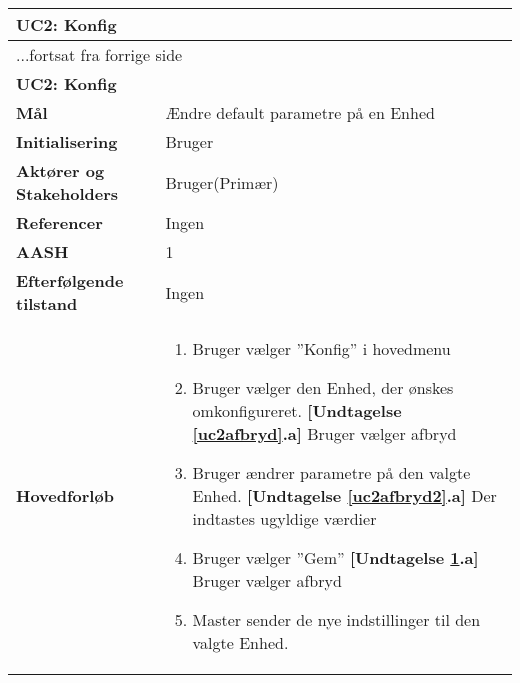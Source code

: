 \begin{center} \centering \label{UC2}
	\begin{longtable}{|p{5cm}|p{9cm}|}  %
	\hline
		\multicolumn{2}{|l|}{\textbf{UC2: Konfig}} \\\hline %
		\endfirsthead
		
		\multicolumn{2}{l}{...fortsat fra forrige side} \\ \hline %
		\multicolumn{2}{|l|}{\textbf{UC2: Konfig}} \\\hline %
		\endhead	
		
		\textbf{Mål}								&Ændre default parametre på en Enhed			\\\hline
		\textbf{Initialisering}					&Bruger							\\\hline
		\textbf{Aktører og Stakeholders}			&Bruger(Primær)					\\\hline
		\textbf{Referencer}						&Ingen							\\\hline
		\textbf{AASH}							&1								\\\hline
		\textbf{Efterfølgende tilstand}			&Ingen							\\\hline
		\textbf{Hovedforløb}					
			&\begin{enumerate}
	
				\item Bruger vælger ''Konfig'' i hovedmenu
				
				\item \label{uc2afbryd}Bruger vælger den Enhed, der ønskes omkonfigureret.\newline
				\textbf{[Undtagelse \ref{uc2afbryd}.a]} \newline
					Bruger vælger afbryd
				
				\item \label{uc2afbryd2}Bruger ændrer parametre på den valgte Enhed.
				\textbf{[Undtagelse \ref{uc2afbryd2}.a]} \newline
					Der indtastes ugyldige værdier	
									
				\item \label{uc2afbryd3} Bruger vælger ''Gem''\newline
				\textbf{[Undtagelse \ref{uc2afbryd3}.a]} \newline
					Bruger vælger afbryd
				
				\item Master sender de nye indstillinger til den valgte Enhed. 
			

\end{enumerate}
\end{longtable}
\end{center}
